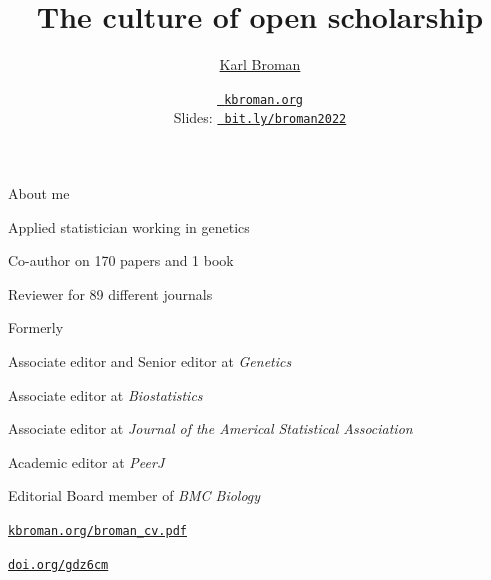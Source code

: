 \documentclass[aspectratio=169,12pt,t]{beamer}
\title{The culture of open scholarship}
\author{\href{https://kbroman.org}{Karl Broman}}
\institute{Biostatistics \& Medical Informatics \\ Univ.\ Wisconsin{\textendash}Madison}
\date{\href{https://kbroman.org}{\tt \scriptsize \color{foreground} kbroman.org}
\\[2pt]
\scriptsize {\lolit Slides:} \href{https://bit.ly/broman2022}{\tt \scriptsize
  \color{foreground} bit.ly/broman2022}
}
\begin{document}
{
 }



\begin{frame}{About me}

  \vspace{-12pt}

  \bbi
\item Applied statistician working in genetics
\item Co-author on 170 papers and 1 book
\item Reviewer for 89 different journals
\item Formerly
  \bi
\item Associate editor and Senior editor at \emph{Genetics}
\item Associate editor at \emph{Biostatistics}
\item Associate editor at \emph{Journal of the Americal Statistical
Association}
\item Academic editor at \emph{PeerJ}
\item Editorial Board member of \emph{BMC Biology}
  \ei
  \ei

  \vspace{30pt}
  \hfill
  \href{https://kbroman.org/broman_cv.pdf}{\tt \footnotesize \lolit kbroman.org/broman{\_}cv.pdf}

  \note{
  }
\end{frame}



\begin{frame}[c]{}

  \vspace{24pt}

  \centerline{}

  \vfill
  \hfill
  \href{https://doi.org/gdz6cm}{\tt \footnotesize \lolit doi.org/gdz6cm}

  \note{
  }
\end{frame}


\begin{frame}[c]{}

  \note{
  }
\end{frame}
\end{document}
